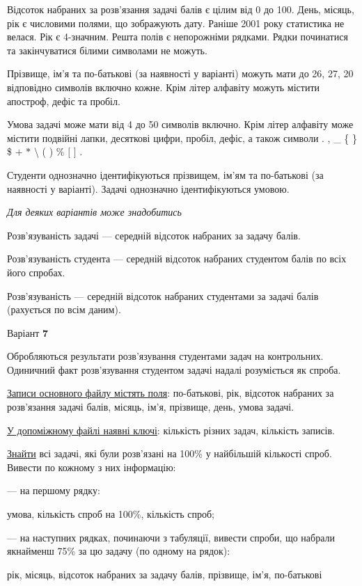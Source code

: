 \documentclass[11pt, ukrainian]{article}
\begin{document}
Відсоток набраних за розв’язання задачі балів є цілим від 0 до 100.
День, місяць, рік є числовими полями, що зображують дату.
Раніше 2001 року статистика не велася. Рік є 4-значним.
Решта полів є непорожніми рядками.
Рядки починатися та закінчуватися білими символами не можуть.

Прізвище, ім’я та по-батькові (за наявності у варіанті) можуть мати до 26, 27, 20 відповідно символів включно кожне. 
Крім літер алфавіту можуть містити апостроф, дефіс та пробіл.

Умова задачі може мати від 4 до 50 символів включно.
Крім літер алфавіту може містити подвійні лапки, десяткові цифри, пробіл, дефіс,
а також символи . , \_ \{ \} \$ $+$ $*$ {\textbackslash} ( ) \% $[$ $]$ .

Студенти однозначно ідентифікуються прізвищем, ім’ям та по-батькові (за наявності у варіанті).
Задачі однозначно ідентифікуються умовою.

\bigskip\textit{Для деяких варіантів може знадобитись}

Розв'язуваність задачі --- середній відсоток набраних за задачу балів.

Розв'язуваність студента --- середній відсоток набраних студентом балів по всіх його спробах.

Розв'язуваність --- середній відсоток набраних студентами за задачі балів (рахується по всім даним).


\par
\newpage
{\center Варіант  \No \textbf { 7 }\par}
\bigskip
Обробляються результати розв’язування студентами задач на контрольних.
Одиничний факт роз\-в’я\-зу\-вання студентом задачі надалі розуміється як спроба.

\underline{Записи основного файлу містять поля}: по-батькові, рік, відсоток набраних за розв’язання задачі балів, місяць, ім’я, прізвище, день, умова задачі.

\underline{У допоміжному файлі наявні ключі}: кількість різних задач, кількість записів.

\underline{Знайти} всі задачі, які були розв’язані на 100\% у найбільшій кількості спроб. Вивести по кожному з них інформацію:\par
{\noindent}--- на першому рядку:\par
умова, кількість спроб на 100\%, кількість спроб;

{\noindent}--- на наступних рядках, починаючи з табуляції, вивести спроби, що набрали якнайменш 75\% за цю задачу (по одному на рядок):\par
рік, місяць, відсоток набраних за задачу балів, прізвище, ім’я, по-батькові
\end{document}
